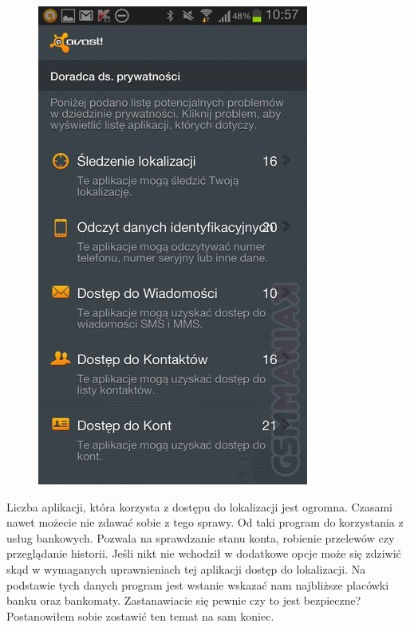 \begin{figure}[H]
\centering
\includegraphics[scale=0.5]{czlonkowie/5/4ss.jpg}
\end{figure}
Liczba aplikacji, która korzysta z dostępu do lokalizacji jest ogromna. Czasami nawet możecie nie zdawać sobie z tego sprawy. Od taki program do korzystania z usług bankowych. Pozwala na sprawdzanie stanu konta, robienie przelewów czy przeglądanie historii. Jeśli nikt nie wchodził w dodatkowe opcje może się zdziwić skąd w wymaganych uprawnieniach tej aplikacji dostęp do lokalizacji. Na podstawie tych danych program jest wstanie wskazać nam najbliższe placówki banku oraz bankomaty. Zastanawiacie się pewnie czy to jest bezpieczne? Postanowiłem sobie zostawić ten temat na sam koniec.
